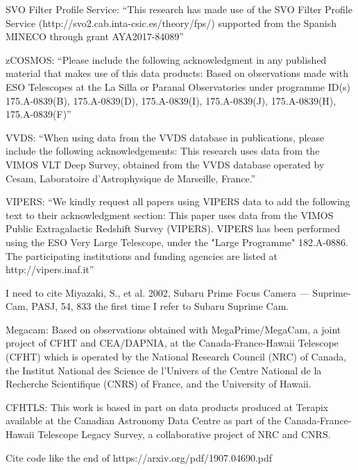 
SVO Filter Profile Service: ``This research has made use of the SVO Filter Profile Service (http://svo2.cab.inta-csic.es/theory/fps/) supported from the Spanish MINECO through grant AYA2017-84089''

zCOSMOS: ``Please include the following acknowledgment in any published material that makes use of this data products: Based on observations made with ESO Telescopes at the La Silla or Paranal Observatories under programme ID(s) 175.A-0839(B), 175.A-0839(D), 175.A-0839(I), 175.A-0839(J), 175.A-0839(H), 175.A-0839(F)''

VVDS: ``When using data from the VVDS database in publications, please include the following acknowledgements: This research uses data from the VIMOS VLT Deep Survey, obtained from the VVDS database operated by Cesam, Laboratoire d'Astrophysique de Marseille, France.''

VIPERS: ``We kindly request all papers using VIPERS data to add the following text to their acknowledgment section: This paper uses data from the VIMOS Public Extragalactic Redshift Survey (VIPERS). VIPERS has been performed using the ESO Very Large Telescope, under the "Large Programme" 182.A-0886. The participating institutions and funding agencies are listed at http://vipers.inaf.it''

I need to cite Miyazaki, S., et al. 2002, Subaru Prime Focus Camera --- Suprime-Cam, PASJ, 54, 833 the first time I refer to Subaru Suprime Cam.

Megacam: Based on observations obtained with MegaPrime/MegaCam, a joint project of CFHT and CEA/DAPNIA, at the Canada-France-Hawaii Telescope (CFHT) which is operated by the National Research Council (NRC) of Canada, the Institut National des Science de l'Univers of the Centre National de la Recherche Scientifique (CNRS) of France, and the University of Hawaii.

CFHTLS: This work is based in part on data products produced at Terapix available at the Canadian Astronomy Data Centre as part of the Canada-France-Hawaii Telescope Legacy Survey, a collaborative project of NRC and CNRS.

Cite code like the end of https://arxiv.org/pdf/1907.04690.pdf